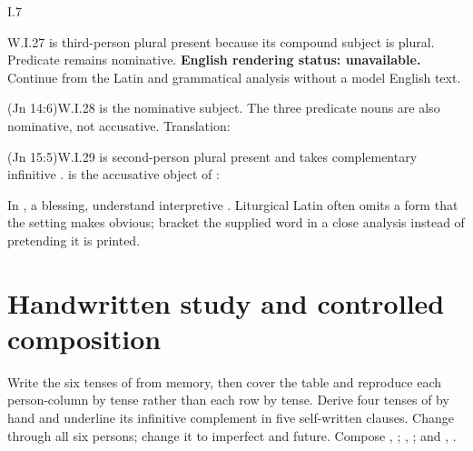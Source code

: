 \begin{courseunit}{I.7}
\begin{workedexample}{}{W.I.27}
 is third-person plural present because its compound subject is
plural. Predicate  remains nominative.
\textbf{English rendering status: unavailable.} Continue from the Latin and
grammatical analysis without a model English text.
\end{workedexample}

\begin{workedexample}{ (Jn 14:6)}{W.I.28}
 is the nominative subject. The three predicate nouns are also
nominative, not accusative. Translation: 
\end{workedexample}

\begin{workedexample}{ (Jn 15:5)}{W.I.29}
 is second-person plural present and takes complementary
infinitive .  is the accusative object of
:
\end{workedexample}

In , a blessing, understand interpretive .
Liturgical Latin often omits a form that the
setting makes obvious; bracket the supplied word in a close analysis instead
of pretending it is printed.

\section{Handwritten study and controlled composition}

Write the six tenses of  from memory, then cover the table and
reproduce each person-column by tense rather than each row by tense. Derive four tenses of  by
hand and underline its infinitive complement in five self-written clauses.
Change  through all six persons; change it to imperfect and
future. Compose , ;
, ; and , .



\end{courseunit}

